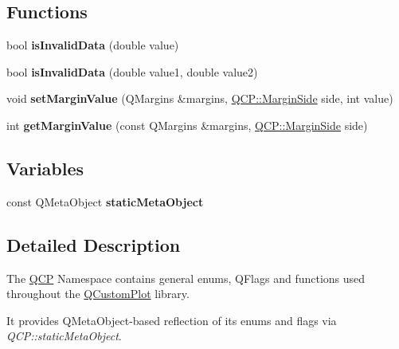\subsection*{Functions}
\begin{DoxyCompactItemize}
\item 
bool {\bfseries is\+Invalid\+Data} (double value)\hypertarget{namespaceQCP_a07ab701c05329089f933b9cae2638a63}{}\label{namespaceQCP_a07ab701c05329089f933b9cae2638a63}

\item 
bool {\bfseries is\+Invalid\+Data} (double value1, double value2)\hypertarget{namespaceQCP_a728903e5c3dd17847bee280f4005496f}{}\label{namespaceQCP_a728903e5c3dd17847bee280f4005496f}

\item 
void {\bfseries set\+Margin\+Value} (Q\+Margins \&margins, \hyperlink{namespaceQCP_a7e487e3e2ccb62ab7771065bab7cae54}{Q\+C\+P\+::\+Margin\+Side} side, int value)\hypertarget{namespaceQCP_afbf6e3084c108f2bb4372107945ee82f}{}\label{namespaceQCP_afbf6e3084c108f2bb4372107945ee82f}

\item 
int {\bfseries get\+Margin\+Value} (const Q\+Margins \&margins, \hyperlink{namespaceQCP_a7e487e3e2ccb62ab7771065bab7cae54}{Q\+C\+P\+::\+Margin\+Side} side)\hypertarget{namespaceQCP_a23a2679d3495c444acc26acc61e35b5b}{}\label{namespaceQCP_a23a2679d3495c444acc26acc61e35b5b}

\end{DoxyCompactItemize}
\subsection*{Variables}
\begin{DoxyCompactItemize}
\item 
const Q\+Meta\+Object {\bfseries static\+Meta\+Object}\hypertarget{namespaceQCP_a07ffa1eb1537a3b1f218ff2a442b2017}{}\label{namespaceQCP_a07ffa1eb1537a3b1f218ff2a442b2017}

\end{DoxyCompactItemize}


\subsection{Detailed Description}
The \hyperlink{namespaceQCP}{Q\+CP} Namespace contains general enums, Q\+Flags and functions used throughout the \hyperlink{classQCustomPlot}{Q\+Custom\+Plot} library.

It provides Q\+Meta\+Object-\/based reflection of its enums and flags via {\itshape Q\+C\+P\+::static\+Meta\+Object}. 

